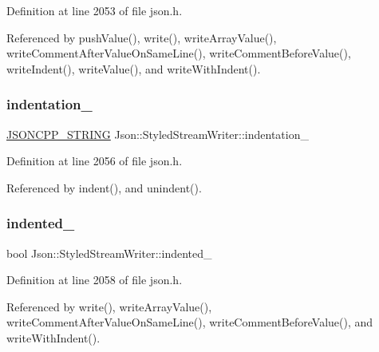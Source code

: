 Definition at line 2053 of file json.\+h.



Referenced by push\+Value(), write(), write\+Array\+Value(), write\+Comment\+After\+Value\+On\+Same\+Line(), write\+Comment\+Before\+Value(), write\+Indent(), write\+Value(), and write\+With\+Indent().

\mbox{\label{class_json_1_1_styled_stream_writer_aa45d8fb4ca82d0550be9042012303713}} 
\subsubsection{\texorpdfstring{indentation\+\_\+}{indentation\_}}
{\footnotesize\ttfamily \hyperlink{json_8h_a1e723f95759de062585bc4a8fd3fa4be}{J\+S\+O\+N\+C\+P\+P\+\_\+\+S\+T\+R\+I\+NG} Json\+::\+Styled\+Stream\+Writer\+::indentation\+\_\+\hspace{0.3cm}{\ttfamily [private]}}



Definition at line 2056 of file json.\+h.



Referenced by indent(), and unindent().

\mbox{\label{class_json_1_1_styled_stream_writer_aa12db1753619a9b48da41f3e45e3275d}} 
\subsubsection{\texorpdfstring{indented\+\_\+}{indented\_}}
{\footnotesize\ttfamily bool Json\+::\+Styled\+Stream\+Writer\+::indented\+\_\+\hspace{0.3cm}{\ttfamily [private]}}



Definition at line 2058 of file json.\+h.



Referenced by write(), write\+Array\+Value(), write\+Comment\+After\+Value\+On\+Same\+Line(), write\+Comment\+Before\+Value(), and write\+With\+Indent().

